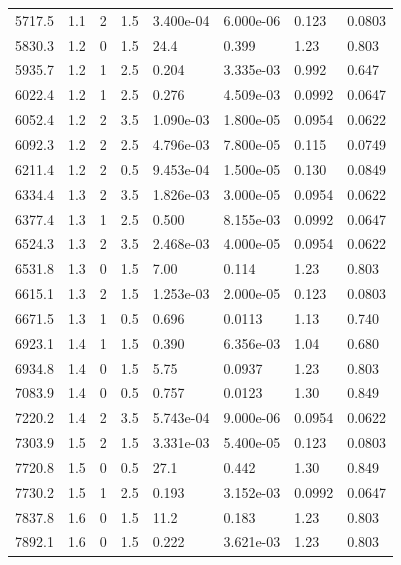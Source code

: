 \documentclass[preview]{standalone}
\begin{document}
{{{\begin{tabular}{L{1.2cm}C{1.2cm} C{0.3cm}C{0.5cm} C{1.4cm}C{1.4cm} C{1.4cm}C{1.4cm}}
  5717.5  &   1.1  & 2     & 1.5 &  3.400e-04  & 6.000e-06  & 0.123 &  0.0803   \\ 
  5830.3  &   1.2  & 0     & 1.5 &  24.4  & 0.399  & 1.23 &  0.803   \\ 
  5935.7  &   1.2  & 1     & 2.5 &  0.204  & 3.335e-03  & 0.992 &  0.647   \\ 
  6022.4  &   1.2  & 1     & 2.5 &  0.276  & 4.509e-03  & 0.0992 &  0.0647   \\ 
  6052.4  &   1.2  & 2     & 3.5 &  1.090e-03  & 1.800e-05  & 0.0954 &  0.0622   \\ 
  6092.3  &   1.2  & 2     & 2.5 &  4.796e-03  & 7.800e-05  & 0.115 &  0.0749   \\ 
  6211.4  &   1.2  & 2     & 0.5 &  9.453e-04  & 1.500e-05  & 0.130 &  0.0849   \\ 
  6334.4  &   1.3  & 2     & 3.5 &  1.826e-03  & 3.000e-05  & 0.0954 &  0.0622   \\ 
  6377.4  &   1.3  & 1     & 2.5 &  0.500  & 8.155e-03  & 0.0992 &  0.0647   \\ 
  6524.3  &   1.3  & 2     & 3.5 &  2.468e-03  & 4.000e-05  & 0.0954 &  0.0622   \\ 
  6531.8  &   1.3  & 0     & 1.5 &  7.00  & 0.114  & 1.23 &  0.803   \\ 
  6615.1  &   1.3  & 2     & 1.5 &  1.253e-03  & 2.000e-05  & 0.123 &  0.0803   \\ 
  6671.5  &   1.3  & 1     & 0.5 &  0.696  & 0.0113  & 1.13 &  0.740   \\ 
  6923.1  &   1.4  & 1     & 1.5 &  0.390  & 6.356e-03  & 1.04 &  0.680   \\ 
  6934.8  &   1.4  & 0     & 1.5 &  5.75  & 0.0937  & 1.23 &  0.803   \\ 
  7083.9  &   1.4  & 0     & 0.5 &  0.757  & 0.0123  & 1.30 &  0.849   \\ 
  7220.2  &   1.4  & 2     & 3.5 &  5.743e-04  & 9.000e-06  & 0.0954 &  0.0622   \\ 
  7303.9  &   1.5  & 2     & 1.5 &  3.331e-03  & 5.400e-05  & 0.123 &  0.0803   \\ 
  7720.8  &   1.5  & 0     & 0.5 &  27.1  & 0.442  & 1.30 &  0.849   \\ 
  7730.2  &   1.5  & 1     & 2.5 &  0.193  & 3.152e-03  & 0.0992 &  0.0647   \\ 
  7837.8  &   1.6  & 0     & 1.5 &  11.2  & 0.183  & 1.23 &  0.803   \\ 
  7892.1  &   1.6  & 0     & 1.5 &  0.222  & 3.621e-03  & 1.23 &  0.803   \\ 

\end{tabular}}}}
\end{document}
